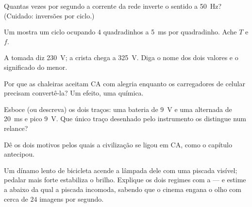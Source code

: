 \begin{exercise}[$\star$]\label{exo:g9:alternating-current:3}
Quantas vezes por segundo a corrente da rede inverte o sentido a
\qty{50}{Hz}? (Cuidado: inversões por ciclo.)
\end{exercise}

\begin{exercise}[$\star$]\label{exo:g9:alternating-current:4}
Um  mostra um ciclo ocupando $4$ quadradinhos a
\qty{5}{ms} por quadradinho. Ache $T$ e $f$.
\end{exercise}

\begin{exercise}[$\star$]\label{exo:g9:alternating-current:5}
A tomada diz \qty{230}{V}; a crista chega a \qty{325}{V}. Diga o nome
dos dois valores e o significado do menor.
\end{exercise}

\begin{exercise}[$\star$]\label{exo:g9:alternating-current:6}
Por que as chaleiras aceitam CA com alegria enquanto os carregadores
de celular precisam convertê-la? Um efeito, uma química.
\end{exercise}

\begin{exercise}[$\star$]\label{exo:g9:alternating-current:7}
Esboce (ou descreva) os dois traços: uma bateria de \qty{9}{V} e uma
 alternada de  \qty{20}{ms} e pico \qty{9}{V}. Que único
traço desenhado pelo instrumento os distingue num relance?
\end{exercise}

\begin{exercise}[$\star$]\label{exo:g9:alternating-current:8}
Dê os dois motivos pelos quais a civilização se ligou em CA, como o
capítulo antecipou.
\end{exercise}

\begin{exercise}[$\star\star$]\label{exo:g9:alternating-current:9}
Um dínamo lento de bicicleta acende a lâmpada dele com uma piscada
visível; pedalar mais forte estabiliza o brilho. Explique os dois
regimes com a  --- e estime a  abaixo da qual a
piscada incomoda, sabendo que o cinema engana o olho com cerca de
$24$ imagens por segundo.
\end{exercise}

